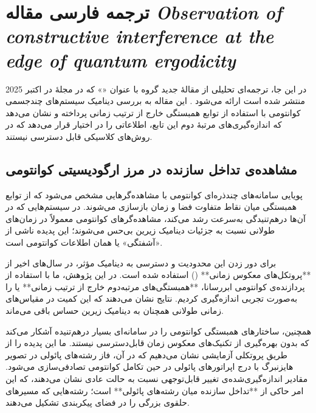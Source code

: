 
\chapter{ترجمه فارسی مقاله \textit{Observation of constructive interference at the edge of quantum ergodicity}}
\label{chap:otoc-translation}

\graphicspath{{figs/}}

در این جا، ترجمه‌ای تحلیلی از مقالهٔ جدید گروه  با عنوان «» که در مجلهٔ  در اکتبر 2025 منتشر شده است ارائه می‌شود \cite{google2025observation}. این مقاله به بررسی دینامیک سیستم‌های چندجسمی کوانتومی با استفاده از توابع همبستگی خارج از ترتیب زمانی  پرداخته و نشان می‌دهد که اندازه‌گیری‌های مرتبهٔ دوم این تابع، اطلاعاتی را در اختیار قرار می‌دهد که در روش‌های کلاسیکی قابل دسترسی نیستند.

\section{مشاهده‌ی تداخل سازنده در مرز ارگودیسیتی کوانتومی}
\label{sec:intro}

پویایی سامانه‌های چندذره‌ای کوانتومی با مشاهده‌گرهایی مشخص می‌شود که از توابع همبستگی میان نقاط متفاوت فضا و زمان بازسازی می‌شوند. در سیستم‌هایی که در آن‌ها درهم‌تنیدگی به‌سرعت رشد می‌کند، مشاهده‌گرهای کوانتومی معمولاً در زمان‌های طولانی نسبت به جزئیات دینامیک زیرین بی‌حس می‌شوند؛ این پدیده ناشی از «آشفتگی» یا همان  اطلاعات کوانتومی است. 

برای دور زدن این محدودیت و دسترسی به دینامیک مؤثر، در سال‌های اخیر از **پروتکل‌های معکوس زمانی** () استفاده شده است. در این پژوهش، ما با استفاده از پردازنده‌ی کوانتومی ابررسانا، **همبستگی‌های مرتبه‌دوم خارج از ترتیب زمانی** یا  را به‌صورت تجربی اندازه‌گیری کردیم. نتایج نشان می‌دهند که این کمیت در مقیاس‌های زمانی طولانی همچنان به دینامیک زیرین حساس باقی می‌ماند. 

همچنین،  ساختارهای همبستگی کوانتومی را در سامانه‌ای بسیار درهم‌تنیده آشکار می‌کند که بدون بهره‌گیری از تکنیک‌های معکوس زمان قابل‌دسترسی نیستند. ما این پدیده را از طریق پروتکلی آزمایشی نشان می‌دهیم که در آن، فاز رشته‌های پائولی در تصویر هایزنبرگ با درج اپراتورهای پائولی در حین تکامل کوانتومی تصادفی‌سازی می‌شود. مقادیر اندازه‌گیری‌شده‌ی  تغییر قابل‌توجهی نسبت به حالت عادی نشان می‌دهند، که این امر حاکی از **تداخل سازنده میان رشته‌های پائولی** است؛ رشته‌هایی که مسیرهای حلقوی بزرگی را در فضای پیکربندی تشکیل می‌دهند.

